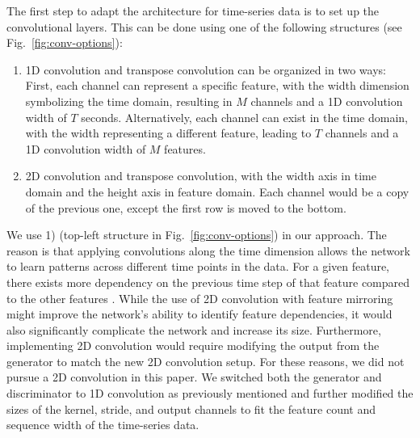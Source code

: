 The first step to adapt the architecture for time-series data is to set up the convolutional layers. This can be done using one of the following structures (see Fig.~\ref{fig:conv-options}):
%
\begin{enumerate}
    \item 1D convolution and transpose convolution can be organized in two ways: First, each channel can represent a specific feature, with the width dimension symbolizing the time domain, resulting in $M$ channels and a 1D convolution width of $T$ seconds. Alternatively, each channel can exist in the time domain, with the width representing a different feature, leading to $T$ channels and a 1D convolution width of $M$ features.
    \item 2D convolution and transpose convolution, with the width axis in time domain and the height axis in feature domain. Each channel would be a copy of the previous one, except the first row is moved to the bottom.
\end{enumerate}
%
We use 1) (top-left structure in Fig.~\ref{fig:conv-options}) in our approach. The reason is that applying convolutions along the time dimension allows the network to learn patterns across different time points in the data. For a given feature, there exists more dependency on the previous time step of that feature compared to the other features \cite{Ismail_Fawaz_2019}.
%
While the use of 2D convolution with feature mirroring might improve the network's ability to identify feature dependencies, it would also significantly complicate the network and increase its size. Furthermore, implementing 2D convolution would require modifying the output from the generator to match the new 2D convolution setup. For these reasons, we did not pursue a 2D convolution in this paper.
%
We switched both the generator and discriminator to 1D convolution as previously mentioned and further modified the sizes of the kernel, stride, and output channels to fit the feature count and sequence width of the time-series data. 

